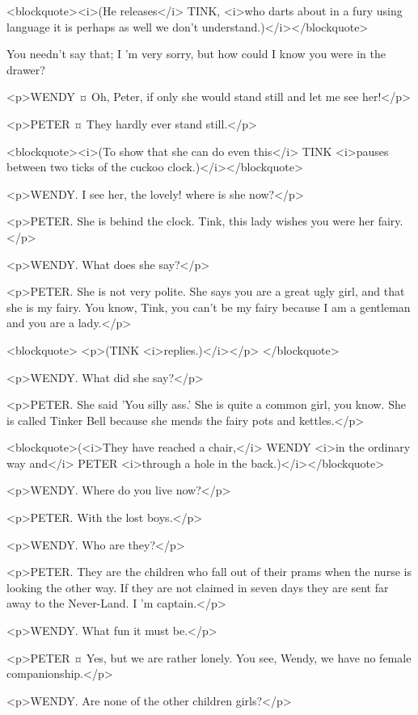 <blockquote><i>(He releases</i> TINK, <i>who darts about in a fury using language it is perhaps as well we don't understand.)</i></blockquote>

You needn't say that; I 'm very sorry, but how could I know you were in the drawer? 

<p>WENDY ¤
Oh, Peter, if only she would stand still and let me see her!</p>

<p>PETER ¤
They hardly ever stand still.</p>

<blockquote><i>(To show that she can do even this</i> TINK <i>pauses between two ticks of the cuckoo clock.)</i></blockquote>

<p>WENDY. I see her, the lovely! where is she now?</p>

<p>PETER. She is behind the clock. Tink, this lady wishes you were her fairy.
</p>

<p>WENDY. What does she say?</p>

<p>PETER. She is not very polite. She says you are a great ugly girl, and that she is my fairy. You know, Tink, you can't be my fairy because I am a gentleman and you are a lady.</p>

<blockquote> <p>(TINK <i>replies.)</i></p> </blockquote>

<p>WENDY. What did she say?</p>

<p>PETER. She said 'You silly ass.' She is quite a common girl, you know. She is called Tinker Bell because she mends the fairy pots and kettles.</p>

<blockquote>(<i>They have reached a chair,</i> WENDY <i>in the ordinary way and</i> PETER <i>through a hole in the back.)</i></blockquote>

<p>WENDY. Where do you live now?</p>

<p>PETER. With the lost boys.</p>

<p>WENDY. Who are they?</p>

<p>PETER. They are the children who fall out of their prams when the nurse is looking the other way. If they are not claimed in seven days they are sent far away to the Never-Land. I 'm captain.</p>

<p>WENDY. What fun it must be.</p>

<p>PETER ¤
Yes, but we are rather lonely. You see, Wendy, we have no female companionship.</p>

<p>WENDY. Are none of the other children girls?</p>

